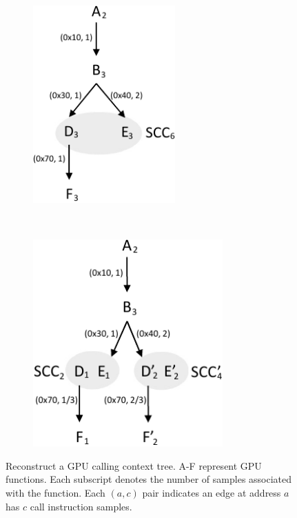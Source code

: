 \begin{figure}[t]
~
\begin{subfigure}{0.22\textwidth}
\centering
\includegraphics[width=0.6\textwidth]{cct-3.pdf}
\caption{}
\end{subfigure}
~
\begin{subfigure}{0.22\textwidth}
\centering
\includegraphics[width=0.8\textwidth]{cct-4.pdf}
\caption{}
\end{subfigure}
\caption{Reconstruct a GPU calling context tree. A-F represent GPU functions. Each subscript denotes the number of samples associated with the function. Each $(a, c)$ pair indicates an edge at address $a$ has $c$ call instruction samples.}
\label{fig:gpu calling context tree}
\end{figure}

